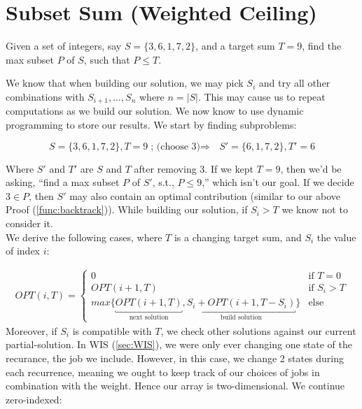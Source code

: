 \newpage
\section{Subset Sum (Weighted Ceiling)}


\begin{Def}

Given a set of integers, say $S=\{3,6,1,7,2\}$, and a target sum $T=9$, find the max subset $P$ of $S$, such that $P\leq T$.
\end{Def}

\noindent
We know that when building our solution, we may pick $S_i$ and try all other combinations with $S_{i+1},\dots,S_n$ where $n=|S|$.
This may cause us to repeat computations as we build our solution. We now know to use dynamic programming to store our results. We
start by finding subproblems:

\[
    S=\{3,6,1,7,2\}, T=9 \text{; (choose 3)$\Rightarrow$ } S'=\{6,1,7,2\}, T'=6
\]

\noindent
Where $S'$ and $T'$ are $S$ and $T$ after removing 3. If we kept $T=9$, then we'd be asking, ``find a max subset $P$ of $S'$, s.t., $P\leq 9$,'' which
isn't our goal. If we decide $3\in P$, then $S'$ may also contain an optimal contribution (similar to our above Proof (\ref{func:backtrack})). While
building our solution, if $S_i>T$ we know not to consider it.\\

\noindent
We derive the following cases, where $T$ is a changing target sum, and $S_i$ the value of index $i$:

\begin{align*}
    OPT(i, T) =
    \begin{cases}
        0 & \text{if $T=0$}\\
        OPT(i+1, T) & \text{if $S_i > T$}\\
        max\{\underbracket{OPT(i+1, T)}_{\text{next solution}}, \underbracket{S_i+OPT(i+1, T-S_i)}_{\text{build solution}}\} & \text{else}
    \end{cases}
\end{align*}
\noindent
Moreover, if $S_i$ is compatible with $T$, we check other solutions against our current partial-solution.
In WIS (\ref{sec:WIS}), we were only ever changing one state of the recurance, the job we include.
However, in this case, we change 2 states during each recurrence, meaning we ought to keep track of our choices of jobs in combination with the weight. 
Hence our array is two-dimensional. We continue zero-indexed:

